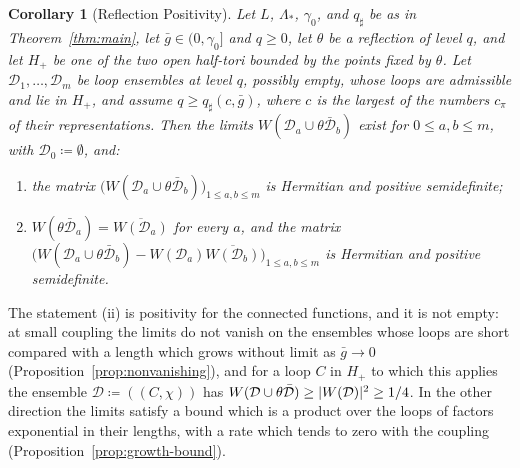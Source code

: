 \documentclass[11pt]{preprint}
\DeclarePairedDelimiter{\abs}{\lvert}{\rvert}
\numberwithin{equation}{section}
\newtheorem{corollary}[theorem]{Corollary}
\theoremstyle{definition}
\theoremstyle{remark}
\theoremstyle{plain}
\begin{document}
\begin{corollary}[Reflection Positivity]\label{cor:reflection-positivity}
Let $L$, $\Lambda_*$, $\gamma_0$, and $q_\sharp$ be as in Theorem~\ref{thm:main}, let $\bar g \in (0, \gamma_0]$ and $q \geq 0$, let $\theta$ be a reflection of level $q$, and let $H_+$ be one of the two open half-tori bounded by the points fixed by $\theta$. Let $\mathcal D_1, \dots, \mathcal D_m$ be loop ensembles at level $q$, possibly empty, whose loops are admissible and lie in $H_+$, and assume $q \geq q_\sharp(c, \bar g)$, where $c$ is the largest of the numbers $c_\pi$ of their representations. Then the limits $W(\mathcal D_a \cup \theta\bar{\mathcal D}_b)$ exist for $0 \leq a, b \leq m$, with $\mathcal D_0 \coloneqq \emptyset$, and:
\begin{enumerate}[label=(\roman*)]
\item the matrix $\bigl(W(\mathcal D_a \cup \theta\bar{\mathcal D}_b)\bigr)_{1 \leq a, b \leq m}$ is Hermitian and positive semidefinite;
\item $W(\theta\bar{\mathcal D}_a) = \overline{W(\mathcal D_a)}$ for every $a$, and the matrix $\bigl(W(\mathcal D_a \cup \theta\bar{\mathcal D}_b) - W(\mathcal D_a)\overline{W(\mathcal D_b)}\bigr)_{1 \leq a, b \leq m}$ is Hermitian and positive semidefinite.
\end{enumerate}
\end{corollary}

The statement (ii) is positivity for the connected functions, and it is not empty: at small coupling the limits do not vanish on the ensembles whose loops are short compared with a length which grows without limit as $\bar g \to 0$ (Proposition~\ref{prop:nonvanishing}), and for a loop $C$ in $H_+$ to which this applies the ensemble $\mathcal D \coloneqq ((C, \chi))$ has $W(\mathcal D \cup \theta\bar{\mathcal D}) \geq \abs{W(\mathcal D)}^2 \geq 1/4$. In the other direction the limits satisfy a bound which is a product over the loops of factors exponential in their lengths, with a rate which tends to zero with the coupling (Proposition~\ref{prop:growth-bound}).
\end{document}
